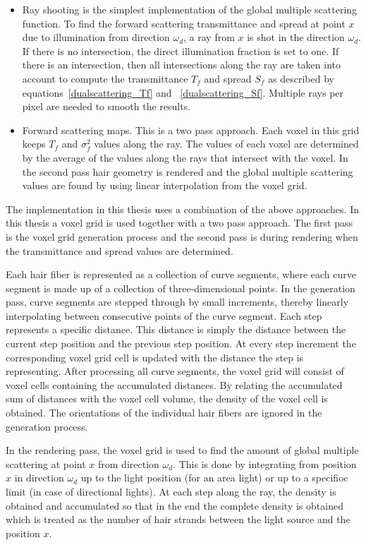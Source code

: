 \documentclass[11pt,a4paper]{report}
\begin{document}
\begin{itemize}
\item Ray shooting is the simplest implementation of the global multiple scattering function. To find the forward scattering transmittance and spread at point $x$ due to illumination from direction $\omega_d$, a ray from $x$ is shot in the direction $\omega_d$. If there is no intersection, the direct illumination fraction is set to one. If there is an intersection, then all intersections along the ray are taken into account to compute the transmittance $T_f$ and spread $S_f$ as described by equations~\ref{dualscattering_Tf} and ~\ref{dualscattering_Sf}. Multiple rays per pixel are needed to smooth the results.

\item Forward scattering maps. This is a two pass approach. Each voxel in this grid keeps $T_f$ and $\sigma_f^2$ values along the ray. The values of each voxel are determined by the average of the values along the rays that intersect with the voxel. In the second pass hair geometry is rendered and the global multiple scattering values are found by using linear interpolation from the voxel grid.
\end{itemize}

The implementation in this thesis uses a combination of the above approaches. In this thesis a voxel grid is used together with a two pass approach. The first pass is the voxel grid generation process and the second pass is during rendering when the transmittance and spread values are determined. 

Each hair fiber is represented as a collection of curve segments, where each curve segment is made up of a collection of three-dimensional points. In the generation pass, curve segments are stepped through by small increments, thereby linearly interpolating between consecutive points of the curve segment. Each step represents a specific distance. This distance is simply the distance between the current step position and the previous step position. At every step increment the corresponding voxel grid cell is updated with the distance the step is representing. After processing all curve segments, the voxel grid will consist of voxel cells containing the accumulated distances. By relating the accumulated sum of distances with the voxel cell volume, the density of the voxel cell is obtained. The orientations of the individual hair fibers are ignored in the generation process. 

In the rendering pass, the voxel grid is used to find the amount of global multiple scattering at point $x$ from direction $\omega_d$. This is done by integrating from position $x$ in direction $\omega_d$ up to the light position (for an area light) or up to a specifioc limit (in case of directional lights). At each step along the ray, the density is obtained and accumulated so that in the end the complete density is obtained which is treated as the number of hair strands between the light source and the position $x$.
\end{document}
